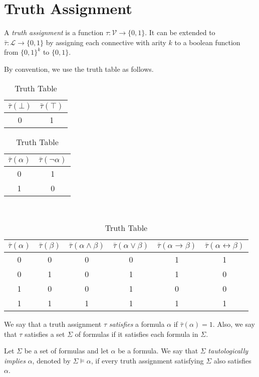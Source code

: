 \section{Truth Assignment}
\begin{definition}
  A \emph{truth assignment} is a function $\tau: \mathcal{V} \to \{0, 1\}$.
  It can be extended to $\bar\tau: \mathcal{L} \to \{0, 1\}$ by assigning each
  connective with arity $k$ to a boolean function from $\{0, 1\}^k$ to
  $\{0, 1\}$.
\end{definition}

\begin{remark}
  By convention, we use the truth table as follows.
  \begin{table}[h!]
    \centering
    \begin{tabular}{cc}
      $\bar\tau(\bot)$ & $\bar\tau(\top)$ \\
      \hline
      0 & 1
    \end{tabular}
    \qquad
    \begin{tabular}{c|c}
      $\bar\tau(\alpha)$ & $\bar\tau(\neg\alpha)$ \\
      \hline
      0 & 1 \\
      1 & 0
    \end{tabular}
    \\[1em]
    \begin{tabular}{cc|cccc}
      $\bar\tau(\alpha)$ & $\bar\tau(\beta)$
        & $\bar\tau(\alpha \wedge \beta)$
        & $\bar\tau(\alpha \vee \beta)$
        & $\bar\tau(\alpha \to \beta)$
        & $\bar\tau(\alpha \leftrightarrow \beta)$ \\
      \hline
      0 & 0 & 0 & 0 & 1 & 1 \\
      0 & 1 & 0 & 1 & 1 & 0 \\
      1 & 0 & 0 & 1 & 0 & 0 \\
      1 & 1 & 1 & 1 & 1 & 1
    \end{tabular}
    \caption{Truth Table}
    \label{table:truth-table}
  \end{table}
\end{remark}

\begin{definition}
  We say that a truth assignment $\tau$ \emph{satisfies} a formula $\alpha$
  if $\bar\tau(\alpha) = 1$.
  Also, we say that $\tau$ satisfies a set $\Sigma$ of formulas if it satisfies
  each formula in $\Sigma$.
\end{definition}

\begin{definition}
  Let $\Sigma$ be a set of formulas and let $\alpha$ be a formula.
  We say that $\Sigma$ \emph{tautologically implies} $\alpha$, denoted by
  $\Sigma \models \alpha$, if every truth assignment satisfying $\Sigma$
  also satisfies $\alpha$.
\end{definition}


